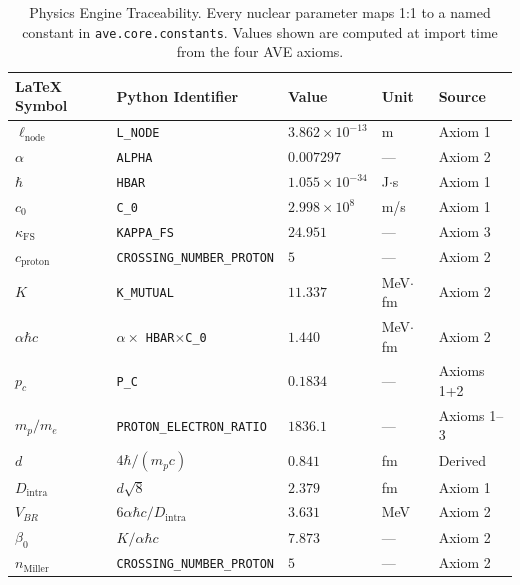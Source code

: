 \begin{table}[htbp]
\centering
\caption{Physics Engine Traceability. Every nuclear parameter maps 1:1 to a named constant in \texttt{ave.core.constants}. Values shown are computed at import time from the four AVE axioms.}
\label{tab:engine_traceability}
\begin{tabular}{l l l l l}
\hline
\textbf{LaTeX Symbol} & \textbf{Python Identifier} & \textbf{Value} & \textbf{Unit} & \textbf{Source} \\
\hline
$\ell_\text{node}$ & \texttt{L\_NODE} & $3.862\times10^{-13}$ & m & Axiom 1 \\
$\alpha$ & \texttt{ALPHA} & $0.007297$ & --- & Axiom 2 \\
$\hbar$ & \texttt{HBAR} & $1.055\times10^{-34}$ & J$\cdot$s & Axiom 1 \\
$c_0$ & \texttt{C\_0} & $2.998\times10^{8}$ & m/s & Axiom 1 \\
$\kappa_\text{FS}$ & \texttt{KAPPA\_FS} & $24.951$ & --- & Axiom 3 \\
$c_\text{proton}$ & \texttt{CROSSING\_NUMBER\_PROTON} & $5$ & --- & Axiom 2 \\
$K$ & \texttt{K\_MUTUAL} & $11.337$ & MeV$\cdot$fm & Axiom 2 \\
$\alpha\hbar c$ & $\alpha \times$ \texttt{HBAR}$\times$\texttt{C\_0} & $1.440$ & MeV$\cdot$fm & Axiom 2 \\
$p_c$ & \texttt{P\_C} & $0.1834$ & --- & Axioms 1+2 \\
$m_p/m_e$ & \texttt{PROTON\_ELECTRON\_RATIO} & $1836.1$ & --- & Axioms 1--3 \\
$d$ & $4\hbar/(m_p c)$ & $0.841$ & fm & Derived \\
$D_\text{intra}$ & $d\sqrt{8}$ & $2.379$ & fm & Axiom 1 \\
$V_{BR}$ & $6\alpha\hbar c / D_\text{intra}$ & $3.631$ & MeV & Axiom 2 \\
$\beta_0$ & $K/\alpha\hbar c$ & $7.873$ & --- & Axiom 2 \\
$n_\text{Miller}$ & \texttt{CROSSING\_NUMBER\_PROTON} & $5$ & --- & Axiom 2 \\
\hline
\end{tabular}
\end{table}

